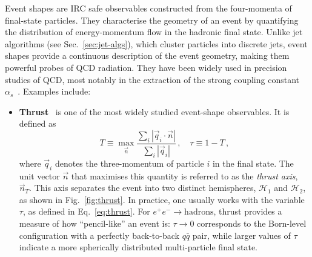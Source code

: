 Event shapes are IRC safe observables constructed 
from the four-momenta of final-state particles. They characterise the geometry 
of an event by quantifying the distribution of energy-momentum flow in the 
hadronic final state. Unlike jet algorithms (see Sec.~\ref{sec:jet-algs}), which cluster particles into 
discrete jets, event shapes provide a continuous description of the 
event geometry, making them powerful probes of QCD 
radiation. They have been widely used in precision studies of QCD, most 
notably in the extraction of the strong coupling constant 
$\alpha_s$~\cite{Becher:2008cf, Abbate:2010xh}. Examples 
include:

\begin{itemize}
\item \textbf{Thrust}~\cite{Farhi:1977sg, Brandt:1964sa} is one of the
most widely studied event-shape observables. It is defined as
\begin{equation}
\label{eq:thrust}
	T \equiv \max_{\vec{n}} \frac{\sum_i |\vec{q}_i \cdot \vec{n}|}{\sum_i |\vec{q}_i|}\,, \quad \tau \equiv 1 - T \,,
\end{equation}
where $\vec{q}_i$ denotes the three-momentum of particle $i$ in the final state. 
The unit vector $\vec{n}$ that maximises this quantity is referred to as the \emph{thrust axis}, $\vec{n}_T$. 
This axis separates the event into two distinct hemispheres, $\mathcal{H}_1$ and $\mathcal{H}_2$, as shown in Fig.~\ref{fig:thrust}. 
In practice, one usually works with the variable $\tau$, as defined in Eq.~\eqref{eq:thrust}.
For $e^+e^- \to \mathrm{hadrons}$, thrust provides a measure of how ``pencil-like'' an event is: $\tau \to 0$ corresponds to the Born-level configuration with a perfectly back-to-back $q\bar{q}$ pair, while larger values of $\tau$ indicate a more spherically distributed multi-particle final state. 
\begin{figure}[H]
\centering
{}
\end{figure}
\end{itemize}
